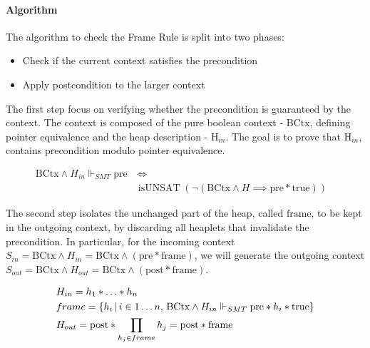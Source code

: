 \documentclass[sigplan,screen,review]{acmart}
\begin{document}
\paragraph{Algorithm} The algorithm to check the Frame Rule is split into two phases: 

\begin{itemize}
    \item Check if the current context satisfies the precondition
    \item Apply postcondition to the larger context
\end{itemize}


The first step focus on verifying whether the precondition is guaranteed by the context.
The context is composed of the pure boolean context - $\mbox{BCtx}$, 
defining pointer equivalence and the heap description - 
$\mbox{H}_{in}$. The goal is to prove that 
$\mbox{H}_{in}$, contains precondition modulo pointer equivalence.

\begin{align*}
\mbox{BCtx} \wedge H_{in} \Vdash_{SMT} \mbox{pre} & \, \iff & \\ & \operatorname{isUNSAT}(\neg(\mbox{BCtx} \wedge H \implies \mbox{pre} \mathbin{*} \mbox{true} ))
\end{align*}



The second step isolates the unchanged part of the heap, called $\mbox{frame}$, to be kept in the outgoing context, by discarding all heaplets that invalidate the precondition. In particular, for the incoming context $S_{in} = \text{BCtx} \wedge H_{in} = \text{BCtx} \wedge (\text{pre} * \text{frame})$, we will generate the outgoing context $S_{out} = \text{BCtx} \wedge H_{out} = \text{BCtx} \wedge (\text{post} * \text{frame})$. 

\begin{align*}
&H_{in} = h_1 \mathbin{*} \dots \mathbin{*} h_n\\
&frame = \* \{ h_i  \,|\, i \in 1\dots n,\, \mbox{BCtx} \wedge H_{in} \Vdash_{SMT} \mbox{pre} \mathbin{*} h_i  \mathbin{*} \text{true} \}\\
&H_{out} = \text{post} \mathbin{*} \prod_{h_j \in frame} h_j = \text{post} \mathbin{*} \text{frame}
\end{align*}
\end{document}
